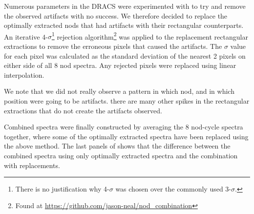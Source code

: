Numerous parameters in the DRACS were experimented with to try and remove the observed artifacts with no success. We therefore decided to replace the optimally extracted nods that had artifacts with their rectangular counterparts. 
An iterative 4-\(\sigma \)\footnote{There is no justification why 4-\(\sigma\) was chosen over the commonly used 3-\(\sigma\).} rejection algorithm\footnote{Found at \url{https://github.com/jason-neal/nod_combination}} was applied to the replacement rectangular extractions to remove the erroneous pixels that caused the artifacts. The \(\sigma\) value for each pixel was calculated as the standard deviation of the nearest 2 pixels on either side of all 8 nod spectra. Any rejected pixels were replaced using linear interpolation.

We note that we did not really observe a pattern in which nod, and in which position were going to be artifacts. there are many other spikes in the rectangular extractions that do not create the artifacts  observed. 

Combined spectra were finally constructed by averaging the 8 nod-cycle spectra together, where some of the optimally extracted spectra have been replaced using the above method. The last panels of  shows that the difference between the combined spectra using only optimally extracted spectra and the combination with replacements.



